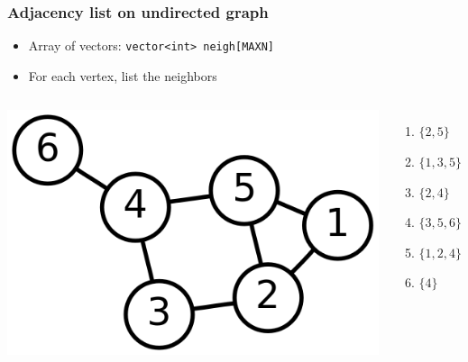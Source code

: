\documentclass[12pt]{beamer}
\begin{document}
\begin{frame}
\frametitle{Adjacency list on undirected graph}
\begin{itemize}
\item Array of vectors: \texttt{vector<int> neigh[MAXN]}
\item For each vertex, list the neighbors
\end{itemize}
\begin{columns}
\flushright
\includegraphics[width=0.75\linewidth]{img/6n-graph}
\begin{enumerate}
\item $\{2,5\}$
\item $\{1,3,5\}$
\item $\{2,4\}$
\item $\{3,5,6\}$
\item $\{1,2,4\}$
\item $\{4\}$
\end{enumerate}
\end{columns}
\end{frame}
\end{document}
